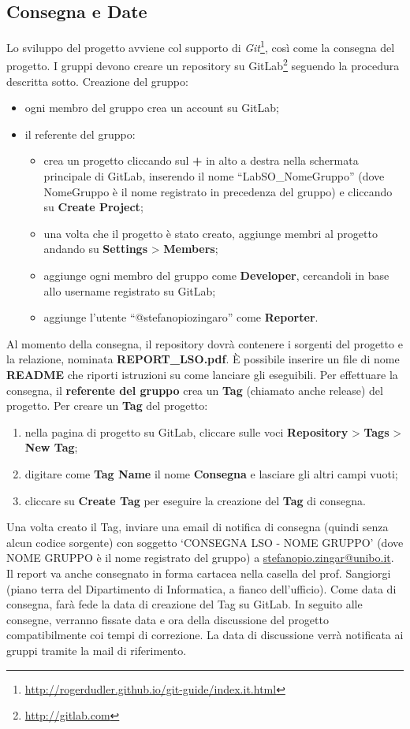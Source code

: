 \documentclass{article}
\begin{document}
\subsection{Consegna e Date}
%
Lo sviluppo del progetto avviene col supporto di \textit{Git}\footnote{\url{http://rogerdudler.github.io/git-guide/index.it.html}}, così come la consegna del progetto.
I gruppi devono creare un repository su GitLab\footnote{\url{http://gitlab.com}} seguendo la procedura descritta sotto.
Creazione del gruppo:
\begin{itemize}
    \item ogni membro del gruppo crea un account su GitLab;
    \item il referente del gruppo:
    \begin{itemize}
        \item crea un progetto cliccando sul \textbf{+} in alto a destra nella schermata principale di GitLab, inserendo il nome ``LabSO\_NomeGruppo'' (dove NomeGruppo è il nome registrato in precedenza del gruppo) e cliccando su \textbf{Create Project};
        \item una volta che il progetto è stato creato, aggiunge membri al progetto andando su \textbf{Settings} > \textbf{Members};
        \item aggiunge ogni membro del gruppo come \textbf{Developer}, cercandoli in base allo username registrato su GitLab;
        \item aggiunge l'utente ``@stefanopiozingaro'' come \textbf{Reporter}.
    \end{itemize}
\end{itemize}
%
Al momento della consegna, il repository dovrà contenere i sorgenti del progetto e la relazione, nominata \textbf{REPORT\_LSO.pdf}. 
È possibile inserire un file di nome \textbf{README} che riporti istruzioni su come lanciare gli eseguibili.
Per effettuare la consegna, il \textbf{referente del gruppo} crea un \textbf{Tag} (chiamato anche release) del progetto. 
Per creare un \textbf{Tag} del progetto:
\begin{enumerate}
    \item nella pagina di progetto su GitLab, cliccare sulle voci \textbf{Repository} > \textbf{Tags} > \textbf{New Tag}; 
    \item digitare come \textbf{Tag Name} il nome \textbf{Consegna} e lasciare gli altri campi vuoti;
    \item cliccare su \textbf{Create Tag} per eseguire la creazione del \textbf{Tag} di consegna.
\end{enumerate}
%
Una volta creato il Tag, inviare una email di notifica di consegna (quindi senza alcun codice sorgente) con soggetto `CONSEGNA LSO - NOME GRUPPO' (dove NOME GRUPPO è il nome registrato del gruppo) a \url{stefanopio.zingar@unibo.it}.
Il report va anche consegnato in forma cartacea nella casella del prof. Sangiorgi (piano terra del Dipartimento di Informatica, a fianco dell'ufficio).
Come data di consegna, farà fede la data di creazione del Tag su GitLab. 
In seguito alle consegne, verranno fissate data e ora della discussione del progetto compatibilmente coi tempi di correzione. 
La data di discussione verrà notificata ai gruppi tramite la mail di riferimento.
%
\end{document}
